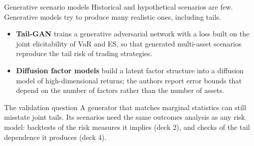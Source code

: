 \documentclass[aspectratio=169,10pt]{beamer}
\begin{document}
\begin{frame}{Generative scenario models}
  \small
  Historical and hypothetical scenarios are few. Generative models try to produce many realistic ones, including tails.
  \begin{itemize}
    \item \textbf{Tail-GAN} \citep{cont2022tailgan} trains a generative adversarial network with a loss built on the joint elicitability of VaR and ES, so that generated multi-asset scenarios reproduce the tail risk of trading strategies.
    \item \textbf{Diffusion factor models} \citep{chen2025diffusion} build a latent factor structure into a diffusion model of high-dimensional returns; the authors report error bounds that depend on the number of factors rather than the number of assets.
  \end{itemize}
  \vspace{0.3em}
  \begin{alertblock}{The validation question}
    A generator that matches marginal statistics can still misstate joint tails. Its scenarios need the same outcomes analysis as any risk model: backtests of the risk measures it implies (deck 2), and checks of the tail dependence it produces (deck 4).
  \end{alertblock}
\end{frame}
\end{document}
